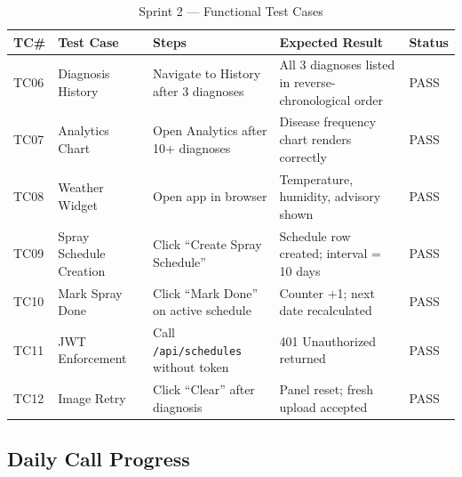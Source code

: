\documentclass[12pt,a4paper]{report}
\begin{document}
\begin{table}[H]
\centering
\caption{Sprint 2 --- Functional Test Cases}
\label{tab:sprint2_tc}
\renewcommand{\arraystretch}{1.4}
\begin{tabular}{|p{0.9cm}|p{2.8cm}|p{4.2cm}|p{4cm}|p{1.4cm}|}
\hline
\textbf{TC\#} & \textbf{Test Case} & \textbf{Steps} & \textbf{Expected Result} & \textbf{Status} \\
\hline
TC06 & Diagnosis History & Navigate to History after 3 diagnoses & All 3 diagnoses listed in reverse-chronological order & PASS \\
\hline
TC07 & Analytics Chart & Open Analytics after 10+ diagnoses & Disease frequency chart renders correctly & PASS \\
\hline
TC08 & Weather Widget & Open app in browser & Temperature, humidity, advisory shown & PASS \\
\hline
TC09 & Spray Schedule Creation & Click ``Create Spray Schedule'' & Schedule row created; interval = 10 days & PASS \\
\hline
TC10 & Mark Spray Done & Click ``Mark Done'' on active schedule & Counter +1; next date recalculated & PASS \\
\hline
TC11 & JWT Enforcement & Call \texttt{/api/schedules} without token & 401 Unauthorized returned & PASS \\
\hline
TC12 & Image Retry & Click ``Clear'' after diagnosis & Panel reset; fresh upload accepted & PASS \\
\hline
\end{tabular}
\end{table}

\subsection{Daily Call Progress}
\end{document}
